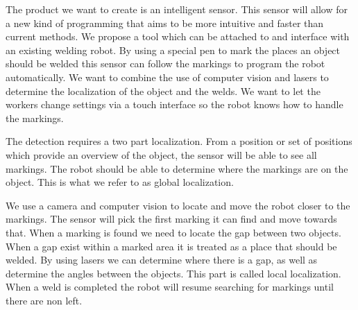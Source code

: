 
The product we want to create is an intelligent sensor.
This sensor will allow for a new kind of programming that aims to be more intuitive and faster than current methods.
We propose a tool which can be attached to and interface with an existing welding robot. 
By using a special pen to mark the places an object should be welded this sensor can follow the markings to program the robot automatically.
We want to combine the use of computer vision and lasers to determine the localization of the object and the welds.
We want to let the workers change settings via a touch interface so the robot knows how to handle the markings. 

The detection requires a two part localization. 
From a position or set of positions which provide an overview of the object, the sensor will be able to see all markings.
The robot should be able to determine where the markings are on the object. 
This is what we refer to as global localization.

We use a camera and computer vision to locate and move the robot closer to the markings.
The sensor will pick the first marking it can find and move towards that. 
When a marking is found we need to locate the gap between two objects. 
When a gap exist within a marked area it is treated as a place that should be welded.
By using lasers we can determine where there is a gap, as well as determine the angles between the objects.
This part is called local localization.
When a weld is completed the robot will resume searching for markings until there are non left.

